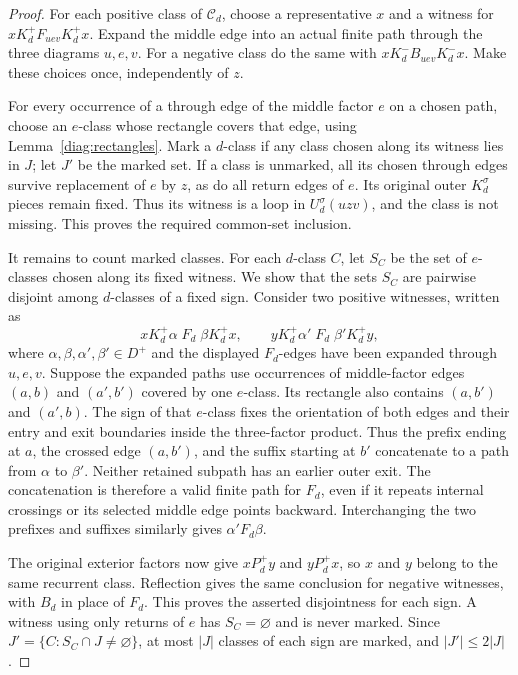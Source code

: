 \begin{proof}
For each positive class of $\mathcal C_d$, choose a representative $x$
and a witness for $xK_d^+F_{uev}K_d^+x$. Expand the middle edge into an
actual finite path through the three diagrams $u,e,v$. For a negative
class do the same with $xK_d^-B_{uev}K_d^-x$. Make these choices once,
independently of $z$.

For every occurrence of a through edge of the middle factor $e$ on a
chosen path, choose an $e$-class whose rectangle covers that edge, using
Lemma~\ref{diag:rectangles}. Mark a $d$-class if any class chosen along
its witness lies in $J$; let $J'$ be the marked set. If a class is
unmarked, all its chosen through edges survive replacement of $e$ by
$z$, as do all return edges of $e$. Its original outer $K_d^\sigma$
pieces remain fixed. Thus its witness is a loop in $U_d^\sigma(uzv)$,
and the class is not missing. This proves the required common-set
inclusion.

It remains to count marked classes. For each $d$-class $C$, let $S_C$
be the set of $e$-classes chosen along its fixed witness. We show that
the sets $S_C$ are pairwise disjoint among $d$-classes of a fixed sign.
Consider two positive witnesses, written as
\[
 xK_d^+\alpha\;F_d\;\beta K_d^+x,
 \qquad yK_d^+\alpha'\;F_d\;\beta'K_d^+y,
\]
where $\alpha,\beta,\alpha',\beta'\in D^+$ and the displayed
$F_d$-edges have been expanded through $u,e,v$.
Suppose the expanded paths use occurrences of middle-factor edges
$(a,b)$ and $(a',b')$ covered by one $e$-class. Its rectangle also
contains $(a,b')$ and $(a',b)$. The sign of that $e$-class fixes the
orientation of both edges and their entry and exit boundaries inside
the three-factor product. Thus the prefix ending at $a$, the crossed
edge $(a,b')$, and the suffix starting at $b'$ concatenate to a path
from $\alpha$ to $\beta'$. Neither retained subpath has an earlier
outer exit. The concatenation is therefore a valid finite path for
$F_d$, even if it repeats internal crossings or its selected middle
edge points backward. Interchanging the two prefixes and suffixes
similarly gives $\alpha'F_d\beta$.

The original exterior factors now give $xP_d^+y$ and $yP_d^+x$, so
$x$ and $y$ belong to the same recurrent class. Reflection gives the
same conclusion for negative witnesses, with $B_d$ in place of $F_d$.
This proves the asserted disjointness for each sign. A witness using
only returns of $e$ has $S_C=\varnothing$ and is never marked. Since
$J'=\{C:S_C\cap J\ne\varnothing\}$, at most $|J|$ classes of each
sign are marked, and $|J'|\le2|J|$.
\end{proof}
